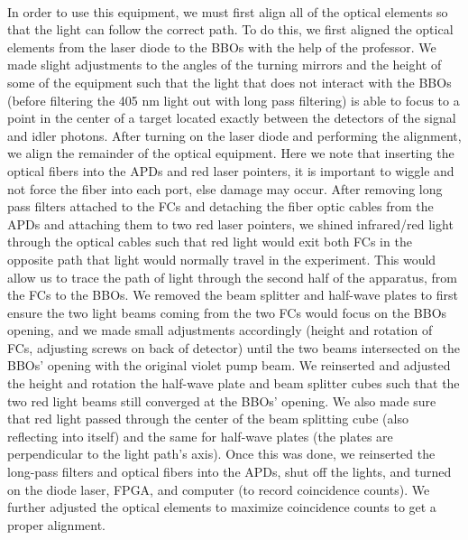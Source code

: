 \documentclass{article}
\begin{document}
    \\\indent In order to use this equipment, we must first align all of the optical elements so that the light can follow the correct path. To do this, we first aligned the optical elements from the laser diode to the BBOs with the help of the professor. We made slight adjustments to the angles of the turning mirrors and the height of some of the equipment such that the light that does not interact with the BBOs (before filtering the 405 nm light out with long pass filtering) is able to focus to a point in the center of a target located exactly between the detectors of the signal and idler photons. After turning on the laser diode and performing the alignment, we align the remainder of the optical equipment. Here we note that inserting the optical fibers into the APDs and red laser pointers, it is important to wiggle and not force the fiber into each port, else damage may occur. After removing long pass filters attached to the FCs and detaching the fiber optic cables from the APDs and attaching them to two red laser pointers, we shined infrared/red light through the optical cables such that red light would exit both FCs in the opposite path that light would normally travel in the experiment. This would allow us to trace the path of light through the second half of the apparatus, from the FCs to the BBOs. We removed the beam splitter and half-wave plates to first ensure the two light beams coming from the two FCs would focus on the BBOs opening, and we made small adjustments accordingly (height and rotation of FCs, adjusting screws on back of detector) until the two beams intersected on the BBOs' opening with the original violet pump beam. We reinserted and adjusted the height and rotation the half-wave plate and beam splitter cubes such that the two red light beams still converged at the BBOs' opening. We also made sure that red light passed through the center of the beam splitting cube (also reflecting into itself) and the same for half-wave plates (the plates are perpendicular to the light path's axis). Once this was done, we reinserted the long-pass filters and optical fibers into the APDs, shut off the lights, and turned on the diode laser, FPGA, and computer (to record coincidence counts). We further adjusted the optical elements to maximize coincidence counts to get a proper alignment.
\end{document}
